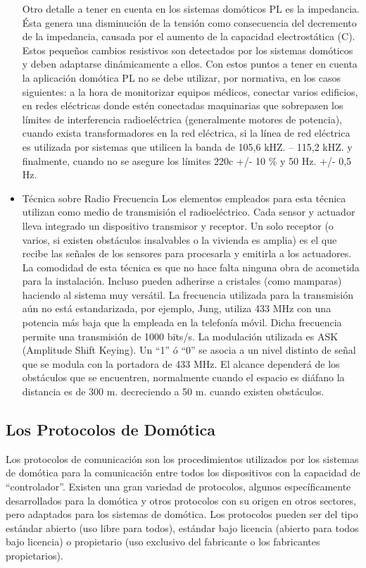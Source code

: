 \documentclass[11pt,letterpaper]{report}
\begin{document}
\begin{itemize}
Otro detalle a tener en cuenta en los sistemas domóticos PL es la impedancia. Ésta genera una disminución de la tensión como consecuencia del decremento de la impedancia, causada por el aumento de la capacidad electrostática (C). Estos pequeños cambios resistivos son detectados por los sistemas domóticos y deben adaptarse dinámicamente a ellos.
Con estos puntos a tener en cuenta la aplicación domótica PL no se debe utilizar, por normativa, en los casos siguientes: a la hora de monitorizar equipos médicos, conectar varios edificios, en redes eléctricas donde estén conectadas maquinarias que sobrepasen los límites de interferencia radioeléctrica (generalmente motores de potencia), cuando exista transformadores en la red eléctrica, si la línea de red eléctrica es utilizada por sistemas que utilicen la banda de 105,6 kHZ. – 115,2 kHZ. y finalmente, cuando no se asegure los límites 220c +/- 10 \% y 50 Hz. +/- 0,5 Hz\citep{Pedro2009}.
		\item Técnica sobre Radio Frecuencia
Los elementos empleados para esta técnica utilizan como medio de transmisión el radioeléctrico. Cada sensor y actuador lleva integrado un dispositivo transmisor y receptor.
Un solo receptor (o varios, si existen obstáculos insalvables o la vivienda es amplia) es el que recibe las señales de los sensores para procesarla y emitirla a los actuadores.
La comodidad de esta técnica es que no hace falta ninguna obra de acometida para la instalación. Incluso pueden adherirse a cristales (como mamparas) haciendo al sistema muy versátil.
La frecuencia utilizada para la transmisión aún no está estandarizada, por ejemplo, Jung, utiliza 433 MHz con una potencia más baja que la empleada en la telefonía móvil. Dicha frecuencia permite una transmisión de 1000 bits/s. La modulación utilizada es ASK (Amplitude Shift Keying). Un “1” ó “0” se asocia a un nivel distinto de señal que se modula con la portadora de 433 MHz. El alcance dependerá de los obstáculos que se encuentren, normalmente cuando el espacio es diáfano la distancia es de 300 m. decreciendo a 50 m. cuando existen obstáculos\citep{Pedro2009}.
		\end{itemize}
		\subsection{ Los Protocolos de Domótica}
		Los protocolos de comunicación son los procedimientos utilizados por los sistemas de domótica para la comunicación entre todos los dispositivos con la capacidad de “controlador”. 
Existen una gran variedad de protocolos, algunos específicamente desarrollados para la domótica y otros protocolos con su origen en otros sectores, pero adaptados para los sistemas de domótica. Los protocolos pueden ser del tipo estándar abierto (uso libre para todos), estándar bajo licencia (abierto para todos bajo licencia) o propietario (uso exclusivo del fabricante o los fabricantes propietarios)\citep{moya2004}.
 
\end{document}
